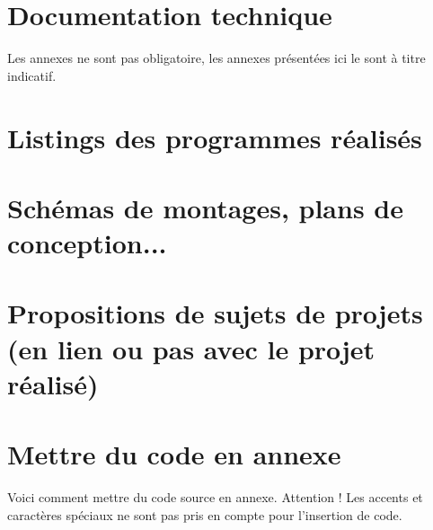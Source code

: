 \documentclass[a4paper, 12pt]{report} %
\begin{document}
\appendix

	\chapter{Documentation technique}

Les annexes ne sont pas obligatoire, les annexes présentées ici le sont à titre indicatif.
	\chapter{Listings des programmes réalisés}
	\chapter{Schémas de montages, plans de conception...}
	\chapter{Propositions de sujets de projets (en lien ou pas avec le projet réalisé)}
	\chapter{Mettre du code en annexe}

	Voici comment mettre du code source en annexe. Attention ! Les accents et caractères spéciaux ne sont pas pris en compte pour l'insertion de code.
\end{document}
